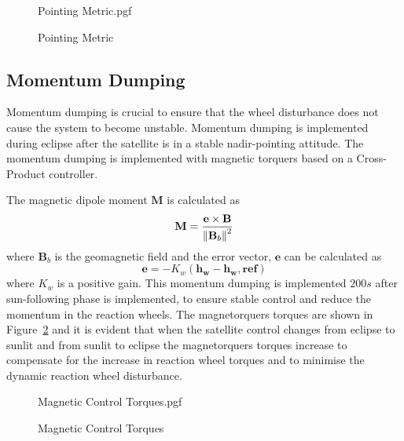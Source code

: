 \begin{figure}[!htb]
	\centering
	\def\pgfwidth{10cm}
	{Pointing Metric.pgf}
	
	\caption{Pointing Metric}
	\label{fig:Pointing Metric}
\end{figure}

\subsection{Momentum Dumping}
Momentum dumping is crucial to ensure that the wheel disturbance does not cause the system to become unstable. Momentum dumping is implemented during eclipse after the satellite is in a stable nadir-pointing attitude. The momentum dumping is implemented with magnetic torquers based on a Cross-Product controller. 

The magnetic dipole moment $\mathbf{M}$ is calculated as 
\begin{equation}
\mathbf{M} = \frac{\mathbf{e} \times \mathbf{B}}{\left\lVert\mathbf{B}_b\right\rVert^2}
\end{equation}
where $\mathbf{B}_b$ is the geomagnetic field and the error vector, $\mathbf{e}$ can be calculated as
\begin{equation}
\mathbf{e} = -K_w(\mathbf{h_w} - \mathbf{h_w,ref})
\end{equation}
where $K_w$ is a positive gain. This momentum dumping is implemented $200s$ after sun-following phase is implemented, to ensure stable control and reduce the momentum in the reaction wheels. The magnetorquers torques are shown in Figure~\ref{fig:Magnetic Control Torques} and it is evident that when the satellite control changes from eclipse to sunlit and from sunlit to eclipse the magnetorquers torques increase to compensate for the increase in reaction wheel torques and to minimise the dynamic reaction wheel disturbance.

\begin{figure}[!htb]
	\centering
	\def\pgfwidth{10cm}
	{Magnetic Control Torques.pgf}
	
	\caption{Magnetic Control Torques}
	\label{fig:Magnetic Control Torques}
\end{figure}


